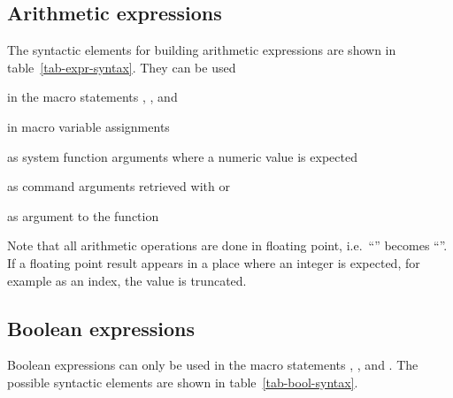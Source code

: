 \subsection{Arithmetic expressions}

The syntactic elements for building arithmetic expressions are shown
in table~\ref{tab-expr-syntax}.
They can be used
\begin{ULc}
\item
in the macro statements , , and 
\item 
in macro variable assignments
\item
as system function arguments where a numeric value is expected
\item
as command arguments retrieved with  or 
\item
as argument to the  function
\end{ULc}

Note that all arithmetic operations are done in floating point, i.e.\
``'' becomes ``''.
If a floating point result appears in a place where an integer is
expected, for example as an index, the value is truncated.


\subsection{Boolean expressions}

Boolean expressions can only be used in the macro statements
, , and .
The possible syntactic elements are shown in table~\ref{tab-bool-syntax}.

